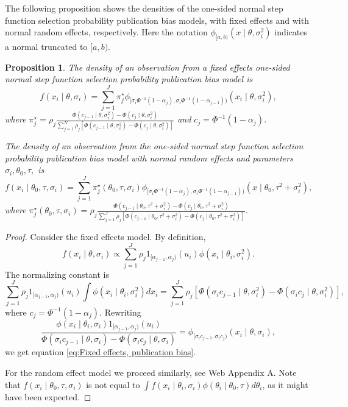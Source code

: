 \documentclass[useAMS,usenatbib,referee]{biom}
\newtheorem{prop}[theorem]{Proposition}
\begin{document}
The following proposition shows the densities of the one-sided normal step function selection probability publication bias models, with fixed effects and with normal random effects, respectively. Here the notation $\phi_{[a,b)}(x\mid\theta,\sigma_i^2)$ indicates a normal truncated to $[a,b)$.
\begin{prop}
\label{prop:One-sided normal discrete probability vector publication bias model-1}
The density of an observation from a fixed effects one-sided normal step function selection probability publication bias model is
\begin{equation}\label{eq:Fixed effects, publication bias}
f(x_{i}\mid\theta,\sigma_{i}) = \sum_{j=1}^{J}\pi_{j}^\star\phi_{[\sigma_i\Phi^{-1}(1-\alpha_{j}),\sigma_i\Phi^{-1}(1-\alpha_{j-1}))}(x_{i}\mid\theta,\sigma_{i}^2),
\end{equation}
where $\pi_{j}^{\star}=\rho_{j}\frac{\Phi(c_{j-1}\mid\theta,\sigma_{i}^2)-\Phi(c_{j}\mid\theta,\sigma_{i}^2)}{\sum_{j=1}^{N}\rho_{j}\left[\Phi(c_{j-1}\mid\theta,\sigma_{i}^2)-\Phi(c_{j}\mid\theta,\sigma_{i}^2)\right]}$ and $c_{j}=\Phi^{-1}(1-\alpha_{j})$.

The density of an observation from the one-sided normal step function selection probability publication bias model with normal random effects and parameters $\sigma_{i},\theta_{0},\tau,$ is
\begin{equation}\label{eq:Random effects, publication bias}
f(x_i\mid\theta_{0},\tau,\sigma_{i})=\sum_{j=1}^{J}\pi_{j}^{\star}(\theta_0,\tau,\sigma_{i})\phi_{[\sigma_i\Phi^{-1}(1-\alpha_{j}),\sigma_i\Phi^{-1}(1-\alpha_{j-1}))}(x\mid\theta_{0},\tau^{2}+\sigma_{i}^{2}),
\end{equation}
where $\pi_{j}^{\star}(\theta_0,\tau,\sigma_{i})=\rho_{j}\frac{\Phi(c_{j-1}\mid\theta_{0},\tau^{2}+\sigma_{i}^{2})-\Phi(c_{j}\mid\theta_{0},\tau^{2}+\sigma_{i}^{2})}{\sum_{j=1}^{J}\rho_{j}\left[\Phi(c_{j-1}\mid\theta_{0},\tau^{2}+\sigma_{i}^{2})-\Phi(c_{j}\mid\theta_{0},\tau^{2}+\sigma_{i}^{2})\right]}$.
\end{prop}

\begin{proof}
Consider the fixed effects model. By definition,
\[
f(x_{i}\mid\theta,\sigma_{i})\propto\sum_{j=1}^{J}\rho_{j}1_{[\alpha_{j-1},\alpha_{j})}(u_{i})\phi(x_{i}\mid\theta_{i},\sigma_{i}^{2}).
\]
The normalizing constant is
\[
\sum_{j=1}^{J}\rho_{j}1_{[\alpha_{j-1},\alpha_{j})}(u_{i})\int\phi(x_{i}\mid\theta_{i},\sigma_{i}^{2})dx_{i}=\sum_{j=1}^{J}\rho_{j}\left[\Phi(\sigma_{i}c_{j-1}\mid\theta,\sigma_{i}^{2})-\Phi(\sigma_{i}c_{j}\mid\theta,\sigma_{i}^{2})\right],
\]
where $c_{j}=\Phi^{-1}(1-\alpha_{j})$. Rewriting
\[
\frac{\phi(x_{i}\mid\theta_{i},\sigma_{i})1_{[\alpha_{j-1},\alpha_{j})}(u_{i})}{\Phi(\sigma_{i}c_{j-1}\mid\theta,\sigma_{i})-\Phi(\sigma_{i}c_{j}\mid\theta,\sigma_{i})}=\phi_{[\sigma_{i}c_{j-1},\sigma_{i}c_{j})}(x_{i}\mid\theta,\sigma_{i}),
\]
we get equation \eqref{eq:Fixed effects, publication bias}. 

For the random effect model we proceed similarly, see Web Appendix A. Note that $f(x_i\mid\theta_{0},\tau,\sigma_i)$ is not equal to $\int f(x_{i}\mid\theta_{i},\sigma_{i})\phi(\theta_{i}\mid\theta_{0},\tau)d\theta_{i}$, as it might have been expected.
\end{proof}
\end{document}
